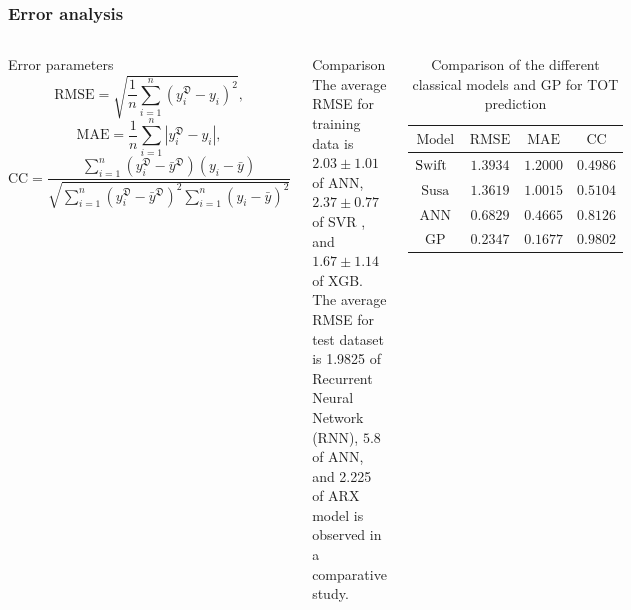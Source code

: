 \documentclass[10pt,hyperref={pdfpagelabels=false}]{beamer}
\begin{document}
\begin{frame}[fragile]
\frametitle{Error analysis}
\begin{columns}
\begin{exampleblock}{Error parameters}
\scriptsize
\begin{equation}
    \mathrm{RMSE}=\sqrt{\frac{1}{n}\sum_{i=1}^{n}(y^{\mathfrak{D}}_i-y_i)^2},
\end{equation}
\begin{equation}
    \mathrm{MAE}=\frac{1}{n}\sum_{i=1}^{n}\left | y^{\mathfrak{D}}_i-y_i \right |,
\end{equation}
\begin{equation*}
    \mathrm{CC}=\frac{\sum_{i=1}^{n}(y^{\mathfrak{D}}_i-\bar{y}^{\mathfrak{D}})(y_i-\bar{y})}{\sqrt{\sum_{i=1}^{n}(y^{\mathfrak{D}}_i-\bar{y}^{\mathfrak{D}})^2\sum_{i=1}^{n}(y_i-\bar{y})^2}}
\end{equation*}
\end{exampleblock}
\begin{alertblock}{Comparison}
\scriptsize
The average RMSE for training data  is $2.03\pm 1.01$ of ANN, $2.37\pm0.77$ of SVR , and  $1.67\pm1.14$ of XGB. The average RMSE for test dataset is 1.9825 of Recurrent Neural Network (RNN),  $5.8$ of ANN, and 2.225 of ARX model is observed in a comparative study. \end{alertblock}
\begin{table}[h!]
\caption{Comparison of the different classical models and GP for TOT prediction} %
\centering %
\begingroup
\footnotesize
\setlength{\tabcolsep}{4.5pt} %
\renewcommand{\arraystretch}{1}
\arrayrulecolor{}
\begin{tabular}{|c | c | c | c|}
\hline %
$\mathrm{Model}$  & $\mathrm{RMSE}$ & $\mathrm{MAE}$ &$\mathrm{CC}$\\
\hline
$\mathrm{Swift\hspace{0.1cm}\hspace{0.1cm} }$  &  $1.3934$ & $1.2000$ & $0.4986$\\
\hline
$\mathrm{Susa}$  &  $1.3619$ & $1.0015$ & $0.5104$\\
\hline
$\mathrm{ANN} $  &  $0.6829$ & $0.4665$ & $0.8126$\\
\hline
$\mathrm{GP }$  &  $0.2347$ & $0.1677$ & $0.9802$\\
\hline
\end{tabular}
\endgroup
\label{tableMSEMAE_erroranalysis} %

\end{table}
\end{columns}
\end{frame}
\end{document}
